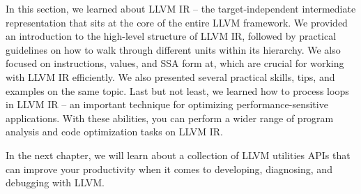 In this section, we learned about LLVM IR – the target-independent intermediate representation that sits at the core of the entire LLVM framework. We provided an introduction to the high-level structure of LLVM IR, followed by practical guidelines on how to walk through different units within its hierarchy. We also focused on instructions, values, and SSA form at, which are crucial for working with LLVM IR efficiently. We also presented several practical skills, tips, and examples on the same topic. Last but not least, we learned how to process loops in LLVM IR – an important technique for optimizing performance-sensitive applications. With these abilities, you can perform a wider range of program analysis and code optimization tasks on LLVM IR.

In the next chapter, we will learn about a collection of LLVM utilities APIs that can improve your productivity when it comes to developing, diagnosing, and debugging with LLVM.